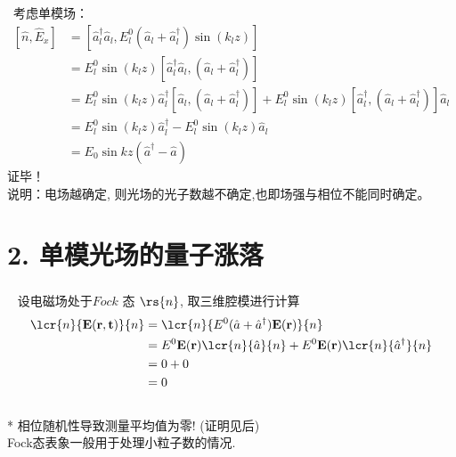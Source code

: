 \begin{frame}
  \frametitle{}
  \例 [2.试证明电场算符与占据数算符不对易] {\[ [\hat{n}, \hat{E}_x] = E_0 \sin{kz}(\hat{a}^{\dagger}-\hat{a})\]}
  \解 ~考虑单模场：
  \[ \begin{aligned}
    [\hat{n}, \hat{E}_x] &= \left[\hat{a}^{\dagger}_l \hat{a}_l, E^0 _l \left(\hat{a}_l+ \hat{a}_l ^\dagger \right) \sin (k_l z)\right] \\
    &= E^0 _l\sin (k_l z)\left[\hat{a}^{\dagger}_l \hat{a}_l,  \left(\hat{a}_l+ \hat{a}_l ^\dagger \right)\right]\\ 
    &= E^0 _l\sin (k_l z)\hat{a}^{\dagger}_l\left[ \hat{a}_l,  \left(\hat{a}_l+ \hat{a}_l ^\dagger \right)\right] + E^0 _l\sin (k_l z)\left[\hat{a}^{\dagger}_l ,  \left(\hat{a}_l+ \hat{a}_l ^\dagger \right)\right]\hat{a}_l\\
    &=  E^0 _l\sin (k_l z)\hat{a}^{\dagger}_l- E^0 _l\sin (k_l z)\hat{a}_l \\ 
    &= E_0 \sin{kz}(\hat{a}^{\dagger}-\hat{a})
  \end{aligned}\] 
  证毕！\\
  说明：电场越确定, 则光场的光子数越不确定,也即场强与相位不能同时确定。
\end{frame}

\section{2. 单模光场的量子涨落}

\begin{frame}
      \frametitle{}
    \证~
    设电磁场处于$Fock$ 态 $\rs{n}$, 取三维腔模进行计算
    \[ 
      \begin{aligned}
        \lcr{n}{\mathbf{E}(\mathbf{r,t})}{n} &= \lcr{n}{E^0  (\hat{a}+ \hat{a} ^\dagger)\mathbf{E}(\mathbf{r})}{n}   \\ 
        &= E^0 \mathbf{E}( \mathbf{r})\lcr{n}{\hat{a} }{n} + E^0 \mathbf{E}( \mathbf{r})\lcr{n}{\hat{a}^\dagger }{n}  \\ 
        &= 0+0 \\ 
        &=0 
      \end{aligned}
      \]   
      ~\\
      * 相位随机性导致测量平均值为零!  (证明见后)\\
      Fock态表象一般用于处理小粒子数的情况.  \\      
\end{frame}

